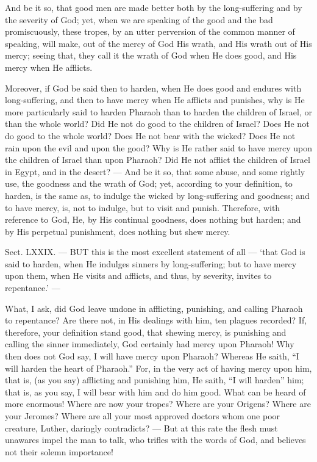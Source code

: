 And be it so, that good men are made better both by the long-suffering and by the severity of God; yet, when we are speaking of the good and the bad promiscuously, these tropes, by an utter perversion of the common manner of speaking, will make, out of the mercy of God His wrath, and His wrath out of His mercy; seeing that, they call it the wrath of God when He does good, and His mercy when He afflicts.

Moreover, if God be said then to harden, when He does good and endures with long-suffering, and then to have mercy when He afflicts and punishes, why is He more particularly said to harden Pharaoh than to harden the children of Israel, or than the whole world? Did He not do good to the children of Israel? Does He not do good to the whole world? Does He not bear with the wicked? Does He not rain upon the evil and upon the good? Why is He rather said to have mercy upon the children of Israel than upon Pharaoh? Did He not afflict the children of Israel in Egypt, and in the desert? — And be it so, that some abuse, and some rightly use, the goodness and the wrath of God; yet, according to your definition, to harden, is the same as, to indulge the wicked by long-suffering and goodness; and to have mercy, is, not to indulge, but to visit and punish. Therefore, with reference to God, He, by His continual goodness, does nothing but harden; and by His perpetual punishment, does nothing but shew mercy.


Sect. LXXIX. — BUT this is the most excellent statement of all — ‘that God is said to harden, when He indulges sinners by long-suffering; but to have mercy upon them, when He visits and afflicts, and thus, by severity, invites to repentance.’ —

What, I ask, did God leave undone in afflicting, punishing, and calling Pharaoh to repentance? Are there not, in His dealings with him, ten plagues recorded? If, therefore, your definition stand good, that shewing mercy, is punishing and calling the sinner immediately, God certainly had mercy upon Pharaoh! Why then does not God say, I will have mercy upon Pharaoh? Whereas He saith, “I will harden the heart of Pharaoh.” For, in the very act of having mercy upon him, that is, (as you say) afflicting and punishing him, He saith, “I will harden” him; that is, as you say, I will bear with him and do him good. What can be heard of more enormous! Where are now your tropes? Where are your Origens? Where are your Jeromes? Where are all your most approved doctors whom one poor creature, Luther, daringly contradicts? — But at this rate the flesh must unawares impel the man to talk, who trifles with the words of God, and believes not their solemn importance!

